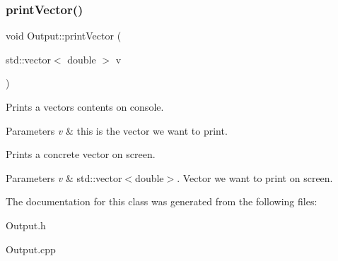 \subsubsection{\texorpdfstring{print\+Vector()}{printVector()}}
{\footnotesize\ttfamily void Output\+::print\+Vector (\begin{DoxyParamCaption}\item[{std\+::vector$<$ double $>$}]{v }\end{DoxyParamCaption})\hspace{0.3cm}{\ttfamily [static]}}

Prints a vector\textquotesingle{}s contents on console. 
\begin{DoxyParams}{Parameters}
{\em v} & this is the vector we want to print.\\
\hline
\end{DoxyParams}
Prints a concrete vector on screen. 
\begin{DoxyParams}{Parameters}
{\em v} & std\+::vector$<$double$>$. Vector we want to print on screen. \\
\hline
\end{DoxyParams}


The documentation for this class was generated from the following files\+:\begin{DoxyCompactItemize}
\item 
Output.\+h\item 
Output.\+cpp\end{DoxyCompactItemize}
